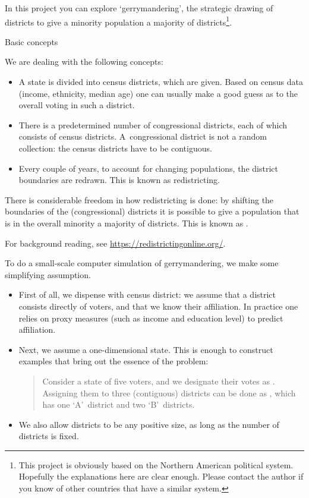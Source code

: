 
In this project you can explore `gerrymandering', the strategic drawing
of districts to give a minority population a majority of
districts\footnote{This project is obviously based on the Northern
  American political system. Hopefully the explanations here are clear
  enough. Please contact the author if you know of other countries
  that have a similar system.}.

 {Basic concepts}

We are dealing with the following concepts:
\begin{itemize}
\item A state is divided into census districts, which are given. Based
  on census data (income, ethnicity, median age) one can
  usually make a good guess as to the overall voting in such a
  district. 
\item There is a predetermined number of congressional districts, each
  of which 
  consists of census districts. A~congressional district is not a
  random collection: the census districts have to be contiguous.
\item Every couple of years, to account for changing populations, the
  district boundaries are redrawn. This is known as redistricting.
\end{itemize}
There is considerable freedom in how redistricting is done: by shifting the
boundaries of the (congressional) districts it is possible to give a
population that is in the overall minority a majority of districts. This is
known as .

For background reading, see \url{https://redistrictingonline.org/}.

To do a small-scale computer simulation of gerrymandering, we make
some simplifying assumption.
\begin{itemize}
\item First of all, we dispense with census district: we assume that a
  district consists directly of voters, and that we know their
  affiliation. In practice one relies on proxy measures (such as
  income and education level) to predict affiliation.
\item Next, we assume a one-dimensional state. This is enough to
  construct examples that bring out the essence of the problem:
\begin{quotation}
  \noindent
  Consider a state of five voters, and we designate their votes as
  . Assigning them to three (contiguous) districts can be
  done as , which has one `A'~district and two
  `B'~districts.
\end{quotation}
\item We also allow districts to be any positive size, as long as the
  number of districts is fixed.
\end{itemize}

